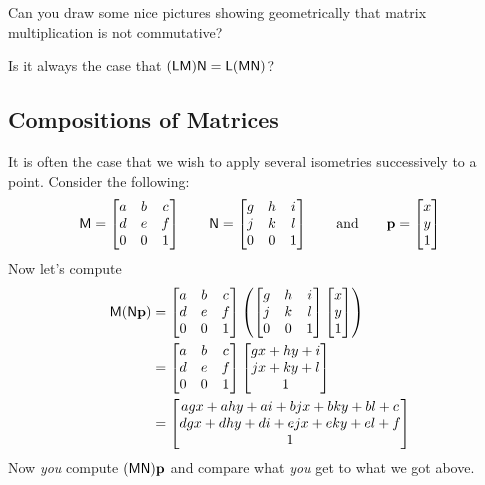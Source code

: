\begin{ques}
Can you draw some nice pictures showing geometrically that matrix
multiplication is not commutative?
\end{ques}
\QM

\begin{ques}
Is it always the case that $(\mathsf{L}\mathsf{M})\mathsf{N} = \mathsf{L}(\mathsf{M}\mathsf{N})$?
\end{ques}
\QM




\subsection{Compositions of Matrices}

It is often the case that we wish to apply several isometries
successively to a point. Consider the following:
\[
\mathsf{M} =
\begin{bmatrix}
a & b & c\\
d & e & f \\
0 & 0 & 1
\end{bmatrix}
\qquad
\mathsf{N} =
\begin{bmatrix}
g & h & i\\
j & k & l\\
0 & 0 & 1
\end{bmatrix}
\qquad\text{and}\qquad \mathbf{p} =
\begin{bmatrix}
x \\
y \\
1
\end{bmatrix}
\]
Now let's compute 
\begin{align*}
\mathsf{M}(\mathsf{N}\mathbf{p}) &= \begin{bmatrix}
a & b & c\\
d & e & f \\
0 & 0 & 1
\end{bmatrix} 
\left(
\begin{bmatrix}
g & h & i\\
j & k & l\\
0 & 0 & 1
\end{bmatrix}
\begin{bmatrix}
x \\
y \\
1
\end{bmatrix}
\right)\\
&= 
\begin{bmatrix}
a & b & c\\
d & e & f \\
0 & 0 & 1
\end{bmatrix} 
\begin{bmatrix}
gx+hy + i\\
jx+ky +l\\
1
\end{bmatrix} \\
&=
\begin{bmatrix}
agx+ahy +ai + bjx+bky+bl+c\\
dgx+dhy+ di + ejx+eky+el+f\\
1
\end{bmatrix}
\end{align*}
Now \textit{you} compute $(\mathsf{M}\mathsf{N})\mathbf{p}$ and compare what
\textit{you} get to what we got above.



